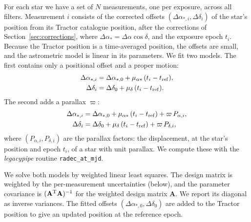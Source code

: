 \documentclass[usenatbib]{mnras}   %
\begin{document}
For each star we have a set of $N$ measurements, one per exposure, across all filters. Measurement $i$ consists of the corrected offsets $(\Delta\alpha_{*,i}, \Delta\delta_i)$ of the star's position from its Tractor catalogue position, after the corrections of Section~\ref{sec:corrections}, where $\Delta\alpha_* = \Delta\alpha\cos\delta$, and the exposure epoch $t_i$. Because the Tractor position is a time-averaged position, the offsets are small, and the astrometric model is linear in its parameters. We fit two models. The first contains only a positional offset and a proper motion:
\begin{equation}
\begin{aligned}
    \Delta\alpha_{*,i} &= \Delta\alpha_{*,0} + \mu_{\alpha*}\,(t_i - t_{\rm ref}), \\
    \Delta\delta_i &= \Delta\delta_0 + \mu_{\delta}\,(t_i - t_{\rm ref}).
\end{aligned}
\label{eq:pm_model}
\end{equation}
The second adds a parallax $\varpi$:
\begin{equation}
\begin{aligned}
    \Delta\alpha_{*,i} &= \Delta\alpha_{*,0} + \mu_{\alpha*}\,(t_i - t_{\rm ref}) + \varpi\,P_{\alpha,i}, \\
    \Delta\delta_i &= \Delta\delta_0 + \mu_{\delta}\,(t_i - t_{\rm ref}) + \varpi\,P_{\delta,i},
\end{aligned}
\label{eq:plx_model}
\end{equation}
where $(P_{\alpha,i}, P_{\delta,i})$ are the parallax factors: the displacement, at the star's position and epoch $t_i$, of a star with unit parallax. We compute these with the \emph{legacypipe} routine \texttt{radec\_at\_mjd}.

We solve both models by weighted linear least squares. The design matrix is weighted by the per-measurement uncertainties (below), and the parameter covariance is $(\mathbf{A}^{\rm T}\mathbf{A})^{-1}$ for the weighted design matrix $\mathbf{A}$. We report its diagonal as inverse variances. The fitted offsets $(\Delta\alpha_{*,0}, \Delta\delta_0)$ are added to the Tractor position to give an updated position at the reference epoch.
\end{document}

